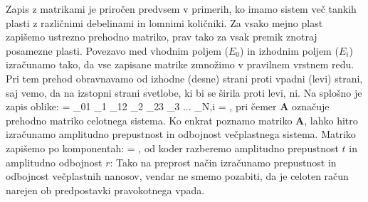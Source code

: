 Zapis z matrikami je priročen predvsem v primerih, ko imamo sistem več tankih plasti
z različnimi debelinami in lomnimi količniki. Za vsako mejno plast zapišemo
ustrezno prehodno matriko, prav tako za vsak premik znotraj posamezne plasti. 
Povezavo med vhodnim poljem ($E_0$) in izhodnim poljem ($E_i$) 
izračunamo tako, da vse zapisane matrike 
zmnožimo v pravilnem vrstnem redu. Pri tem 
prehod obravnavamo od izhodne (desne) strani proti vpadni (levi) strani, saj vemo, da na
izstopni strani svetlobe, ki bi se širila proti levi, ni. 
Na splošno je zapis oblike:
\beq
\left[\begin{array}{c}
E_{0}\\
E_{0}'\\
\end{array}\right] = 
_{01}
_1
_{12}
_2
_{23}
_3 ... _{N,i}
\left[\begin{array}{c}
E_i\\
0\\
\end{array}\right] =
\left[\begin{array}{c}
E_i\\
0\\
\end{array}\right]\!\!,
\label{eq:06_63}
\eeq
pri čemer $\mathbf{A}$ označuje prehodno matriko celotnega sistema. Ko enkrat 
poznamo matriko $\mathbf{A}$, lahko hitro izračunamo amplitudno 
prepustnost in odbojnost večplastnega sistema. Matriko zapišemo
po komponentah:
\beq
\left[\begin{array}{c}
E_{0}\\
E_{0}'\\
\end{array}\right] =
\left[\begin{array}{cc}
A_{11}& A_{12}\\
A_{21}& A_{22}\\
\end{array}\right]\cdot
\left[\begin{array}{c}
E_i\\
0\\
\end{array}\right]\!\!,
\label{eq:06_64}
\eeq
od koder razberemo amplitudno prepustnost $t$ in amplitudno odbojnost $r$:
Tako na preprost način izračunamo prepustnost in odbojnost
večplastnih nanosov, vendar ne smemo pozabiti, 
da je celoten račun narejen ob predpostavki pravokotnega vpada.

